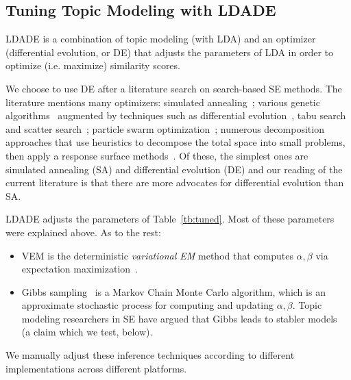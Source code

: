 \documentclass[10pt,conference]{IEEEtran}
\newcommand{\bi}{\begin{itemize}}
\newcommand{\ei}{\end{itemize}}
\theoremstyle{break}
\begin{document}
\subsection{Tuning Topic Modeling with LDADE}
\label{sect: tuning}
LDADE is a combination of topic modeling (with LDA) and an optimizer (differential evolution, or DE) that adjusts
the parameters of LDA in order to optimize (i.e. maximize) similarity scores.

We choose to use DE after a literature search on search-based SE methods.
The literature mentions many optimizers: simulated
annealing~\cite{feather2002converging, menzies2007business}; various genetic
algorithms~\cite{goldberg1979complexity} augmented by techniques such as
differential evolution~\cite{storn1997differential}, tabu search and scatter
search~\cite{glover1986general, beausoleil2006moss, molina2007sspmo,
  nebro2008abyss}; particle swarm optimization~\cite{pan2008particle}; numerous
decomposition approaches that use heuristics to decompose the total space into
small problems, then apply a response surface methods~\cite{krall2015gale,
  zuluaga2013active}. Of these, the simplest ones are simulated annealing (SA)
and differential evolution (DE) and  our reading of the current literature is
that there are more advocates for differential evolution than SA. 

LDADE  adjusts the parameters of
Table~\ref{tb:tuned}. Most of these parameters were explained above. As to the rest:
\bi
\item VEM is the deterministic {\em variational EM} method that computes $\alpha,\beta$ via
  expectation maximization~\cite{minka2002expectation}.
\item Gibbs sampling~\cite{wei2006lda, griffiths2004finding} is a Markov Chain Monte Carlo algorithm, which is an approximate stochastic process for computing and updating $\alpha,\beta$.
  Topic modeling researchers in SE have argued that Gibbs leads to stabler models~\cite{layman16a,layman2016topic} (a claim which we test, below).
  \ei

We manually adjust these inference techniques according to different implementations across different platforms.
\end{document}
